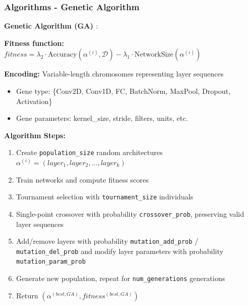 \documentclass{beamer}
\begin{document}
    \begin{frame}
        \frametitle{Algorithms - Genetic Algorithm}
        \textbf{Genetic Algorithm (GA) \cite{idrissi_genetic_2016}}: \\
        {
            \footnotesize
            \textbf{Fitness function:} $fitness = \lambda_2 \cdot \text{Accuracy}(\alpha^{(i)}, \mathcal{D}) - \lambda_1 \cdot \text{NetworkSize}(\alpha^{(i)})$
            
            \textbf{Encoding:} Variable-length chromosomes representing layer sequences
            \begin{itemize}
                \item Gene type: \{Conv2D, Conv1D, FC, BatchNorm, MaxPool, Dropout, Activation\}
                \item Gene parameters: kernel\_size, stride, filters, units, etc.
            \end{itemize}

            \textbf{Algorithm Steps:}
            \begin{enumerate}
                \item Create \texttt{population\_size} random architectures $\alpha^{(i)} = (layer_1, layer_2, ..., layer_k)$
                \item Train networks and compute fitness scores
                \item Tournament selection with \texttt{tournament\_size} individuals
                \item Single-point crossover with probability \texttt{crossover\_prob}, preserving valid layer sequences 
                \item Add/remove layers with probability \texttt{mutation\_add\_prob} / \texttt{mutation\_del\_prob} and modify layer parameters with probability \texttt{mutation\_param\_prob}
                \item Generate new population, repeat for \texttt{num\_generations} generations
                \item Return $(\alpha^{(best, GA)}, fitness^{(best, GA)})$
            \end{enumerate}
        }
    \end{frame}
\end{document}
